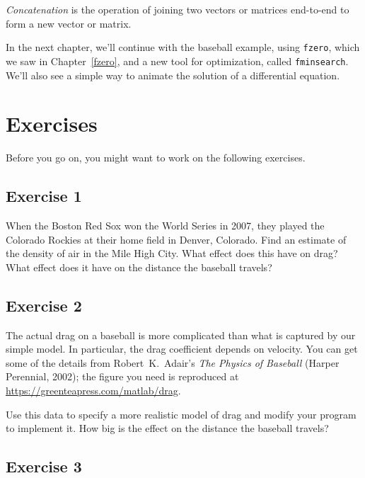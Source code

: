 \emph{Concatenation} is the operation of joining two vectors or matrices end-to-end to
form a new vector or matrix.

In the next chapter, we'll continue with the baseball example, using \lstinline{fzero}, which we saw in Chapter~\ref{fzero}, and a new tool for optimization, called \lstinline{fminsearch}.  We'll also see a simple way to animate the solution of a differential equation.


\section{Exercises}

Before you go on, you might want to work on the following exercises.

\subsection{Exercise 1}


When the Boston Red Sox won the World Series in 2007, they played the
Colorado Rockies at their home field in Denver, Colorado.  Find an
estimate of the density of air in the Mile High City.  What effect
does this have on drag?  What effect does it have on the distance the baseball travels?

\subsection{Exercise 2}


The actual drag on a baseball is more complicated than what is
captured by our simple model.  In particular, the drag coefficient
depends on velocity.  You can get some of the details from Robert~K.\ Adair's \emph{The
Physics of Baseball} (Harper Perennial, 2002); the figure you need is reproduced at \url{https://greenteapress.com/matlab/drag}.

Use this data to specify a more realistic model of drag and modify your
program to implement it.  How big is the effect on the distance the baseball travels?


\subsection{Exercise 3}
\label{cannon}


